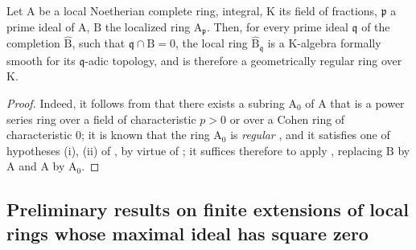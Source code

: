 \begin{corollary}[22.3.4]
\label{0.22.3.4}
Let $\mathrm{A}$ be a local Noetherian complete ring, integral, $\mathrm{K}$ its field of fractions, $\mathfrak{p}$ a prime ideal of $\mathrm{A}$, $\mathrm{B}$ the localized ring $\mathrm{A}_\mathfrak{p}$.
Then, for every prime ideal $\mathfrak{q}$ of the completion $\widehat{\mathrm{B}}$, such that $\mathfrak{q}\cap\mathrm{B}=0$, the local ring $\widehat{\mathrm{B}}_\mathfrak{q}$ is a $\mathrm{K}$-algebra formally smooth for its $\mathfrak{q}$-adic topology, and is therefore a geometrically regular ring over $\mathrm{K}$.
\end{corollary}

\begin{proof}
Indeed, it follows from  that there exists a subring $\mathrm{A}_0$ of $\mathrm{A}$ that is a power series ring over a field of characteristic $p>0$ or over a Cohen ring of characteristic $0$; it is known that the ring $\mathrm{A}_0$ is \emph{regular} , and it satisfies one of hypotheses (i), (ii) of , by virtue of ; it suffices therefore to apply , replacing $\mathrm{B}$ by $\mathrm{A}$ and $\mathrm{A}$ by $\mathrm{A}_0$.
\end{proof}

\subsection{Preliminary results on finite extensions of local rings whose maximal ideal has square zero}
\label{subsection:0.22.4}
\label{0.22.4}

